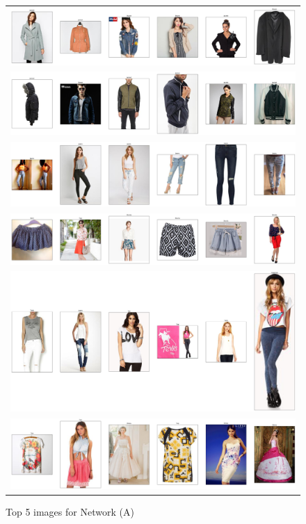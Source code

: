 \documentclass{article}
\begin{document}
\begin{figure}
\begin{tabular}{c}
{\includegraphics[width = 5in]{a/search_idx_3012.png}}\\
{\includegraphics[width = 5in]{a/search_idx_3013.png}}\\
{\includegraphics[width = 5in]{a/search_idx_4002.png}}\\
{\includegraphics[width = 5in]{a/search_idx_7513.png}}\\
{\includegraphics[width = 5in]{a/search_idx_8716.png}}\\
{\includegraphics[width = 5in]{a/search_idx_9388.png}}
\end{tabular}
\caption{Top 5 images for Network (A)}
\label{fig:img_netA}
\end{figure}
\end{document}
